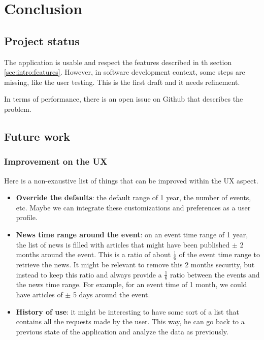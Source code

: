 \chapter{Conclusion}
\label{chapter:conclusions}

\section{Project status}
The application is usable and respect the features described in th section \ref{sec:intro:features}. However, in software development context, some steps are missing, like the user testing. This is the first draft and it needs refinement.

In terms of performance, there is an open issue on Github that describes the problem.

\section{Future work}

\subsection{Improvement on the UX}
Here is a non-exaustive list of things that can be improved within the UX aspect.
\begin{itemize}
    \item \textbf{Override the defaults}: the default range of 1 year, the number of events, etc. Maybe we can integrate these customizations and preferences as a user profile.
    \item \textbf{News time range around the event}: on an event time range of 1 year, the list of news is filled with articles that might have been published $\pm$ 2 months around the event. This is a ratio of about $\frac{1}{6}$ of the event time range to retrieve the news. It might be relevant to remove this 2 months security, but instead to keep this ratio and always provide a $\frac{1}{6}$ ratio between the events and the news time range. For example, for an event time of 1 month, we could have articles of $\pm$ 5 days around the event.
    \item \textbf{History of use}: it might be interesting to have some sort of a list that contains all the requests made by the user. This way, he can go back to a previous state of the application and analyze the data as previously.
\end{itemize}

